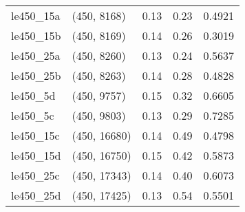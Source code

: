 \begin{tabular}{llrrr}
 le450\_15a &  (450, 8168) &      0.13 &     0.23 & 0.4921 \\
 le450\_15b &  (450, 8169) &      0.14 &     0.26 & 0.3019 \\
 le450\_25a &  (450, 8260) &      0.13 &     0.24 & 0.5637 \\
 le450\_25b &  (450, 8263) &      0.14 &     0.28 & 0.4828 \\
  le450\_5d &  (450, 9757) &      0.15 &     0.32 & 0.6605 \\
  le450\_5c &  (450, 9803) &      0.13 &     0.29 & 0.7285 \\
 le450\_15c & (450, 16680) &      0.14 &     0.49 & 0.4798 \\
 le450\_15d & (450, 16750) &      0.15 &     0.42 & 0.5873 \\
 le450\_25c & (450, 17343) &      0.14 &     0.40 & 0.6073 \\
 le450\_25d & (450, 17425) &      0.13 &     0.54 & 0.5501 \\
\bottomrule
\end{tabular}
